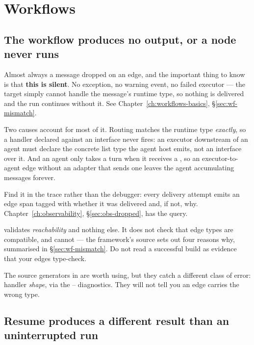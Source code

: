 \section{Workflows}

\subsection{The workflow produces no output, or a node never runs}

Almost always a message dropped on an edge, and the important thing to know is
that \textbf{this is silent}. No exception, no warning event, no failed executor
--- the target simply cannot handle the message's runtime type, so nothing is
delivered and the run continues without it. See
Chapter~\ref{ch:workflows-basics}, \S\ref{sec:wf-mismatch}.

Two causes account for most of it. Routing matches the runtime type
\emph{exactly}, so a handler declared against an interface never fires: an
executor downstream of an agent must declare the concrete list type the agent
host emits, not an interface over it. And an agent only takes a turn when it
receives a , so an executor-to-agent edge without an adapter that
sends one leaves the agent accumulating messages forever.

Find it in the trace rather than the debugger: every delivery attempt emits an
edge span tagged with whether it was delivered and, if not, why.
Chapter~\ref{ch:observability}, \S\ref{sec:obs-dropped}, has the query.

\begin{warning}
 validates \emph{reachability} and nothing else. It does not check
that edge types are compatible, and cannot --- the framework's source sets out
four reasons why, summarised in \S\ref{sec:wf-mismatch}. Do not read a successful
build as evidence that your edges type-check.

The source generators in  are worth
using, but they catch a different class of error: handler \emph{shape}, via the
-- diagnostics. They will not tell you an
edge carries the wrong type.
\end{warning}

\subsection{Resume produces a different result than an uninterrupted run}

